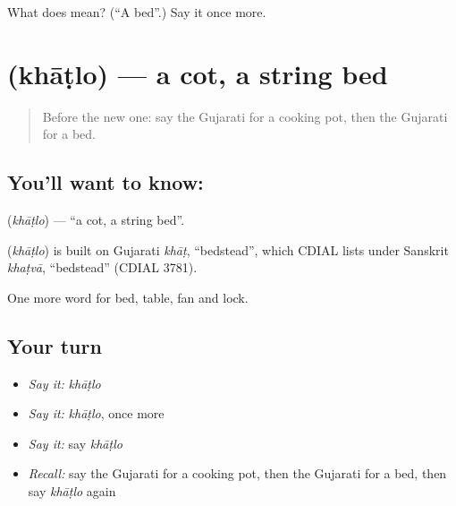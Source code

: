 \begin{tcolorbox}[breakable,colback=teal!4,colframe=teal!35!black,title={Before you move on}]
What does  mean? (\textquotedblleft{}A bed\textquotedblright{}.) Say it once more.
\end{tcolorbox}
\section[\texorpdfstring{\gu{ખાટલો} (khāṭlo)}{ખાટલો (khāṭlo)}]{ (khāṭlo) — a cot, a string bed}

\label{lesson:GU-C62-cot}



\begin{quote}
Before the new one: say the Gujarati for a cooking pot, then the Gujarati for a bed.
\end{quote}

\subsection*{You'll want to know: }
\textbf{} (\emph{khāṭlo}) — \textquotedblleft{}a cot, a string bed\textquotedblright{}.

\begin{cousinweb}
\textbf{} (\emph{khāṭlo}) is built on Gujarati \emph{khāṭ}, \textquotedblleft{}bedstead\textquotedblright{}, which CDIAL lists under Sanskrit \emph{khaṭvā}, \textquotedblleft{}bedstead\textquotedblright{} (CDIAL 3781).
\end{cousinweb}

\begin{grammarlens}[title={What you've built}]
One more word for bed, table, fan and lock.
\end{grammarlens}

\subsection*{Your turn}
\begin{itemize}
\raggedright
  \item \emph{Say it:} \emph{khāṭlo}
  \item \emph{Say it:} \emph{khāṭlo}, once more
  \item \emph{Say it:} say \emph{khāṭlo}
  \item \emph{Recall:} say the Gujarati for a cooking pot, then the Gujarati for a bed, then say \emph{khāṭlo} again
\end{itemize}

